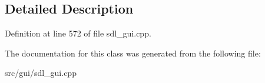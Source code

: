 \subsection{Detailed Description}


Definition at line 572 of file sdl\-\_\-gui.\-cpp.



The documentation for this class was generated from the following file\-:\begin{DoxyCompactItemize}
\item 
src/gui/sdl\-\_\-gui.\-cpp\end{DoxyCompactItemize}
